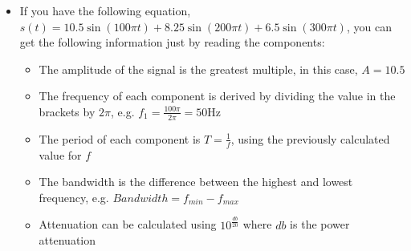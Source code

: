 
\begin{itemize}
  \item If you have the following equation, $s(t) = 10.5\sin(100\pi t) + 8.25\sin(200\pi t) + 6.5\sin(300\pi t)$, you can get the following information just by reading the components:
  \begin{itemize}
    \item The amplitude of the signal is the greatest multiple, in this case, $A = 10.5$
    \item The frequency of each component is derived by dividing the value in the brackets by $2\pi$, e.g. $f_1 = \frac{100\pi}{2\pi} = 50\mathrm{Hz}$
    \item The period of each component is $T = \frac{1}{f}$, using the previously calculated value for $f$
    \item The bandwidth is the difference between the highest and lowest frequency, e.g. $Bandwidth = f_{min} - f_{max}$
    \item Attenuation can be calculated using $10^{\frac{db}{20}}$ where $db$ is the power attenuation
  \end{itemize}
\end{itemize}